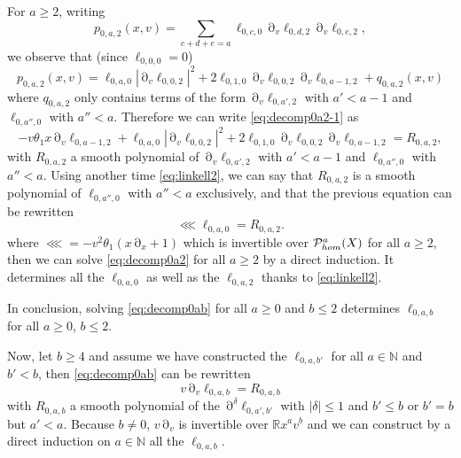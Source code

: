 \documentclass[12pt]{amsart}
\newcommand{\N}{\mathbb N}
\newcommand{\R}{\mathbb R}
\numberwithin{equation}{section}
\numberwithin{figure}{section}
\DeclareMathOperator{\p}{\partial}
\begin{document}
For $a\geq2$, writing
\begin{equation*}
p_{0,a,2}(x,v) = \sum_{c + d + e = a}\ell_{0,c,0}\p_v\ell_{0,d,2}\p_v\ell_{0,e,2},
\end{equation*}
we observe that (since $\ell_{0,0,0} = 0$)
\begin{equation*}
p_{0,a,2}(x,v) = \ell_{0,a,0}|\p_v\ell_{0,0,2}|^2 + 2\ell_{0,1,0}\p_v\ell_{0,0,2}\p_v\ell_{0,a-1,2} + q_{0,a,2}(x,v)
\end{equation*}
where $q_{0,a,2}$ only contains terms of the form $\p_v\ell_{0,a',2}$ with $a'<a-1$ and $\ell_{0,a'',0}$ with $a''<a$. Therefore we can write \eqref{eq:decomp0a2-1} as
\begin{equation*}
-v\theta_1x\p_v\ell_{0,a-1,2} + \ell_{0,a,0}|\p_v\ell_{0,0,2}|^2 + 2\ell_{0,1,0}\p_v\ell_{0,0,2}\p_v\ell_{0,a-1,2} = R_{0,a,2},
\end{equation*}
with $R_{0,a,2}$ a smooth polynomial of $\p_v\ell_{0,a',2}$ with $a'<a-1$ and $\ell_{0,a'',0}$ with $a''<a$. Using another time \eqref{eq:linkell2}, we can say that $R_{0,a,2}$ is a smooth polynomial of $\ell_{0,a'',0}$ with $a''<a$ exclusively, and that the previous equation can be rewritten
\begin{equation}\label{eq:decomp0a2}
\lll \ell_{0,a,0} = R_{0,a,2}.
\end{equation}
where $\lll = -v^2\theta_1(x\p_x+1)$ which is invertible over ${\mathcal P}^{a}_{hom}(X)$ for all $a\geq2$, then we can solve \eqref{eq:decomp0a2} for all $a\geq2$ by a direct induction. It determines all the $\ell_{0,a,0}$ as well as the $\ell_{0,a,2}$ thanks to \eqref{eq:linkell2}.

In conclusion, solving \eqref{eq:decomp0ab} for all $a\geq0$ and $b\leq2$ determines $\ell_{0,a,b}$ for all $a\geq0$, $b\leq2$.

Now, let $b\geq4$ and assume we have constructed the $\ell_{0,a,b'}$ for all $a\in\N$ and $b'<b$, then \eqref{eq:decomp0ab} can be rewritten
\begin{equation*}
v\p_v\ell_{0,a,b} = R_{0,a,b}
\end{equation*}
with $R_{0,a,b}$ a smooth polynomial of the $\p^\delta\ell_{0,a',b'}$ with $|\delta|\leq1$ and $b'\leq b$ or $b'=b$ but $a'<a$. Because $b\neq0$, $v\p_v$ is invertible over $\R x^av^b$ and we can construct by a direct induction on $a\in\N$ all the $\ell_{0,a,b}$.
\end{document}
